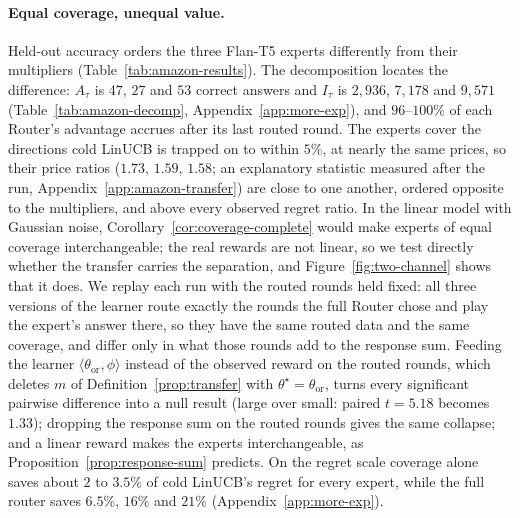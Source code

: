 \documentclass[anon]{alt2027} %
\begin{document}
\paragraph{Equal coverage, unequal value.}
Held-out accuracy orders the three Flan-T5 experts differently from their
multipliers (Table~\ref{tab:amazon-results}). The decomposition locates the difference:
$A_\tau$ is $47$, $27$ and $53$ correct answers and $I_\tau$ is $2{,}936$,
$7{,}178$ and $9{,}571$ (Table~\ref{tab:amazon-decomp},
Appendix~\ref{app:more-exp}), and $96$--$100\%$ of
each Router's advantage accrues after its last routed round. The experts
cover the directions cold LinUCB is trapped on to within $5\%$, at nearly the
same prices, so their price ratios ($1.73$, $1.59$, $1.58$; an explanatory
statistic measured after the run, Appendix~\ref{app:amazon-transfer}) are
close to one another, ordered opposite to the multipliers, and above every
observed regret ratio. In the linear model with Gaussian noise,
Corollary~\ref{cor:coverage-complete} would make experts of equal coverage
interchangeable; the real rewards are not linear, so we test directly whether
the transfer carries the separation, and Figure~\ref{fig:two-channel} shows
that it does. We replay each run with the routed rounds held fixed: all three
versions of the learner route exactly the rounds the full Router chose and
play the expert's answer there, so they have the same routed data and the same
coverage, and differ only in what those rounds add to the response sum.
Feeding the learner $\langle\theta_{\mathrm{or}},\phi\rangle$ instead of the
observed reward on the routed rounds, which deletes $m$ of
Definition~\ref{prop:transfer} with $\theta^\star=\theta_{\mathrm{or}}$, turns
every significant pairwise difference into a null result (large over small:
paired $t=5.18$ becomes $1.33$); dropping the response sum on the routed
rounds gives the same collapse; and a linear reward makes the experts
interchangeable, as Proposition~\ref{prop:response-sum} predicts. On the
regret scale coverage alone saves about $2$ to $3.5\%$ of cold LinUCB's
regret for every expert, while the full router saves $6.5\%$, $16\%$ and
$21\%$ (Appendix~\ref{app:more-exp}).
\end{document}
